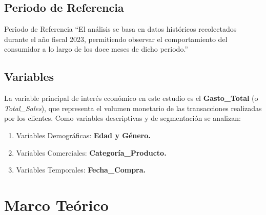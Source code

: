 \documentclass[oneside,11pt]{Latex/Classes/PhDthesisPSnPDF}
\begin{document}
\begin{table}[ht]
\centering
\caption{Variables consideradas}
\end{table}

\section{Periodo de Referencia}

Periodo de Referencia ``El análisis se basa en datos históricos
recolectados durante el año fiscal 2023, permitiendo observar el
comportamiento del consumidor a lo largo de los doce meses de dicho
periodo.''

\section{Variables}

La variable principal de interés económico en este estudio es el
\textbf{Gasto\_Total} (o \emph{Total\_Sales}), que representa el volumen
monetario de las transacciones realizadas por los clientes. Como
variables descriptivas y de segmentación se analizan:

\begin{enumerate}
\def\labelenumi{\arabic{enumi}.}
\item
  Variables Demográficas: \textbf{Edad y Género.}
\item
  Variables Comerciales: \textbf{Categoría\_Producto.}
\item
  Variables Temporales: \textbf{Fecha\_Compra.}
\end{enumerate}

\chapter{Marco Teórico}
\end{document}
